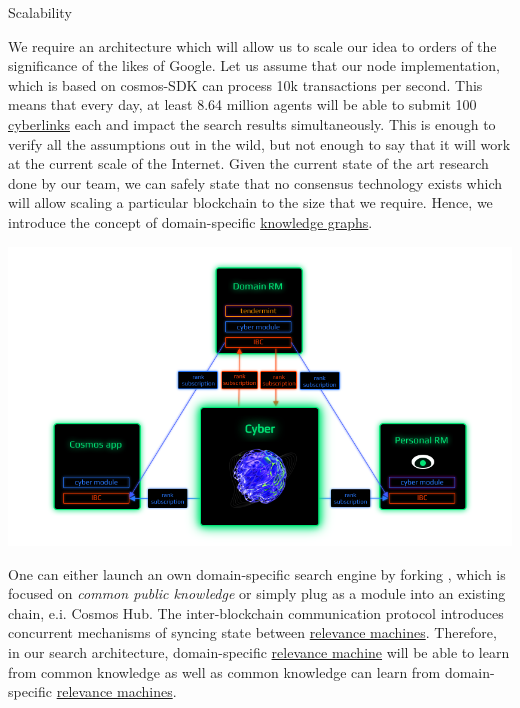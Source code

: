 \documentclass[8pt,oneside]{amsart}
\makeatletter
\newcommand{\linkred}[2]{\href{#1}{\color{red}{#2}}}
\renewcommand\subsection{\@startsection{subsection}
                                    {2}{\z@}
                                    {-3.25ex\@plus -1ex \@minus -.2ex}
                                    {0ex \@plus .2ex}
                                    {\play\Large}
                        }
\newcommand{\titleSection}[1]{\subsection{#1}}
\newcommand{\code}[1]{{\PlayBold #1}}
\newenvironment{Figure}
  {\par\medskip\noindent\minipage{\linewidth}}
  {\endminipage\par\medskip}
\makeatother
\begin{document}
\titleSection{Scalability}\label{scalability}

We require an architecture which will allow us to scale our idea to orders of the significance of the likes of Google. Let us assume that our node implementation, which is based on \code{cosmos-SDK} can process 10k transactions per second. This means that every day, at least 8.64 million agents will be able to submit 100 {\hyperref[cyberlinks]{cyberlinks}} each and impact the search results simultaneously. This is enough to verify all the assumptions out in the wild, but not enough to say that it will work at the current scale of the Internet. Given the current state of the art research done by our team, we can safely state that no consensus technology exists which will allow scaling a particular blockchain to the size that we require. Hence, we introduce the concept of domain-specific {\hyperref[knowledge-graph]{knowledge graphs}}.

\begin{Figure}
    \centering
    \includegraphics[width=1\textwidth]{network.png}
\end{Figure}

One can either launch an own domain-specific search engine by forking \linkred{https://github.com/cybercongress/cyberd}{cyberd}, which is focused on \textit{common public knowledge} or simply plug \linkred{https://github.com/cybercongress/cyberd}{cyberd} as a module into an existing chain, e.i. Cosmos Hub. The inter-blockchain communication protocol introduces concurrent mechanisms of syncing state between {\hyperref[relevance-machine]{relevance machines}}. Therefore, in our search architecture, domain-specific {\hyperref[relevance-machine]{relevance machine}} will be able to learn from common knowledge as well as common knowledge can learn from domain-specific {\hyperref[relevance-machine]{relevance machines}}.
\end{document}
